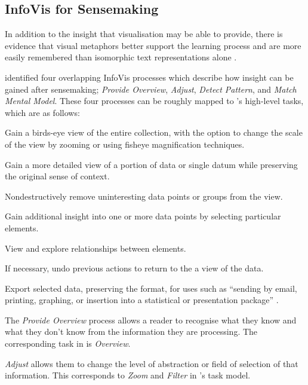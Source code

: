 \subsection{InfoVis for Sensemaking}

In addition to the insight that visualisation may be able to provide, there is evidence that visual metaphors better support the learning process and are more easily remembered than isomorphic text representations alone \citep{KnowledgeMapsAsScaffolds, ImageBasedConceptMapping}.

\citet{UnderstandingAndCharacterizingInsights} identified four overlapping InfoVis processes which describe how insight can be gained after sensemaking; \textit{Provide Overview}, \textit{Adjust}, \textit{Detect Pattern}, and \textit{Match Mental Model}. These four processes can be roughly mapped to \citeauthor{TheEyesHaveIt}'s high-level tasks, which are as follows:

\begin{description}[leftmargin=11em,style=nextline]
	\item [Overview] Gain a birds-eye view of the entire collection, with the option to change the scale of the view by zooming or using fisheye magnification techniques.
	\item[Zoom] Gain a more detailed view of a portion of data or single datum while preserving the original sense of context.
	\item[Filter] Nondestructively remove uninteresting data points or groups from the view.
	\item[Details-on-Demand] Gain additional insight into one or more data points by selecting particular elements.
	\item[Relate] View and explore relationships between elements.
	\item[History] If necessary, undo previous actions to return to the a view of the data.
	\item[Extract] Export selected data, preserving the format, for uses such as ``sending by email, printing, graphing, or insertion into a statistical or presentation package'' \citep[p.5]{TheEyesHaveIt}.
\end{description}

The \textit{Provide Overview} process allows a reader to recognise what they know and what they don't know from the information they are processing. The corresponding task in \citep{TheEyesHaveIt} is \textit{Overview}.

\textit{Adjust} allows them to change the level of abstraction or field of selection of that information. This corresponds to \textit{Zoom} and \textit{Filter} in \citeauthor{TheEyesHaveIt}'s task model.

